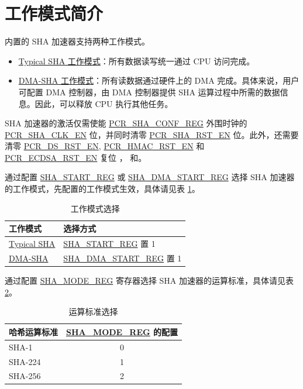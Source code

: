 \documentclass[main\_\_CN.tex]{subfiles}
\begin{document}
\section{工作模式简介}
\chipname{} 内置的 SHA 加速器支持两种工作模式。

\begin{itemize}
    \item \hyperref[sec:sha-typical-sha]{Typical SHA 工作模式}：所有数据读写统一通过 CPU 访问完成。
    \item \hyperref[sec:sha-dma-sha]{DMA-SHA 工作模式}：所有读数据通过硬件上的 DMA 完成。具体来说，用户可配置 DMA 控制器，由 DMA 控制器提供 SHA 运算过程中所需的数据信息。因此，可以释放 CPU 执行其他任务。
\end{itemize}

SHA 加速器的激活仅需使能 \hyperref[regdesc:PCRSHACONFREG]{PCR\_SHA\_CONF\_REG} 外围时钟的 \hyperref[fielddesc:PCRRSACLKEN]{PCR\_SHA\_CLK\_EN} 位，并同时清零 \hyperref[fielddesc:PCRRSARSTEN]{PCR\_SHA\_RST\_EN} 位。此外，还需要清零 \hyperref[fielddesc:PCRDSRSTEN]{PCR\_DS\_RST\_EN}, \hyperref[fielddesc:PCRHMACRSTEN]{PCR\_HMAC\_RST\_EN} 和 \hyperref[fielddesc:PCRECDSARSTEN]{PCR\_ECDSA\_RST\_EN} 复位 ， 和。


通过配置 \hyperref[regdesc:SHASTARTREG]{SHA\_START\_REG} 或 \hyperref[regdesc:SHADMASTARTREG]{SHA\_DMA\_START\_REG} 选择 SHA 加速器的工作模式，先配置的工作模式生效，具体请见表 \ref{tab:sha-hash-algo-select}。

\begin{longtable}[c]{ |l|l| }
\caption{工作模式选择}
\label{tab:sha-hash-algo-select}
\\\hline
\rowcolor{lightgray}
\textbf{工作模式}      & \textbf{选择方式}\\
    \hline
    \hyperref[sec:sha-typical-sha]{Typical SHA}      &  \hyperref[regdesc:SHASTARTREG]{SHA\_START\_REG} 置 1   \\
    \hline
    \hyperref[sec:sha-dma-sha]{DMA-SHA}           &  \hyperref[regdesc:SHADMASTARTREG]{SHA\_DMA\_START\_REG} 置 1   \\
    \hline
\end{longtable}

通过配置 \hyperref[regdesc:SHAMODEREG]{SHA\_MODE\_REG} 寄存器选择 SHA 加速器的运算标准，具体请见表 \ref{tab:sha-mode-summary}。

\begin{longtable}[c]{|l|c|}
\caption{运算标准选择}
\label{tab:sha-mode-summary}
\\\hline
\rowcolor{lightgray}
\textbf{哈希运算标准} & \textbf{\hyperref[regdesc:SHAMODEREG]{SHA\_MODE\_REG} 的配置}\\
    \hline
    SHA-1 & 0\\
    \hline
    SHA-224 & 1\\
    \hline
    SHA-256 & 2\\
    \hline
\end{longtable}
\end{document}
